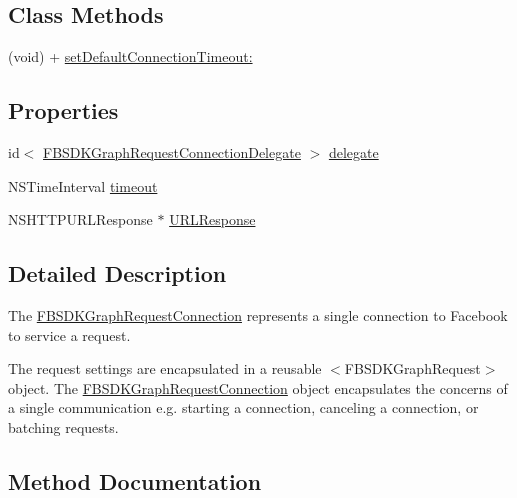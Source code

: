 \subsection*{Class Methods}
\begin{DoxyCompactItemize}
\item 
(void) + \hyperlink{interface_f_b_s_d_k_graph_request_connection_a56bb5be30c62d87e140ed38c49bf85fd}{set\+Default\+Connection\+Timeout\+:}
\end{DoxyCompactItemize}
\subsection*{Properties}
\begin{DoxyCompactItemize}
\item 
id$<$ \hyperlink{protocol_f_b_s_d_k_graph_request_connection_delegate-p}{F\+B\+S\+D\+K\+Graph\+Request\+Connection\+Delegate} $>$ \hyperlink{interface_f_b_s_d_k_graph_request_connection_ac52bf8613194e0184e5ac33806dd6f7c}{delegate}
\item 
N\+S\+Time\+Interval \hyperlink{interface_f_b_s_d_k_graph_request_connection_ad70caeba73b8f5c748d2f34b0bec74e0}{timeout}
\item 
N\+S\+H\+T\+T\+P\+U\+R\+L\+Response $\ast$ \hyperlink{interface_f_b_s_d_k_graph_request_connection_a5179644ed8074f7e45e664c6ec5b17ab}{U\+R\+L\+Response}
\end{DoxyCompactItemize}


\subsection{Detailed Description}
The {\ttfamily \hyperlink{interface_f_b_s_d_k_graph_request_connection}{F\+B\+S\+D\+K\+Graph\+Request\+Connection}} represents a single connection to Facebook to service a request.

The request settings are encapsulated in a reusable $<$\+F\+B\+S\+D\+K\+Graph\+Request$>$ object. The {\ttfamily \hyperlink{interface_f_b_s_d_k_graph_request_connection}{F\+B\+S\+D\+K\+Graph\+Request\+Connection}} object encapsulates the concerns of a single communication e.\+g. starting a connection, canceling a connection, or batching requests. 

\subsection{Method Documentation}
\hypertarget{interface_f_b_s_d_k_graph_request_connection_a78390d62d921d5b8a9019b1122b9bfec}{}
